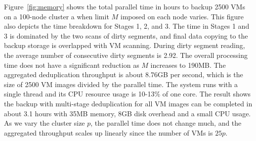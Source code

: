 %

Figure~\ref{fig:memory} shows the total parallel time in hours to backup 2500 VMs on
 a 100-node cluster a  when 
limit $M$ imposed on each node varies.
This figure also depicts the time breakdown for Stages 1, 2, and 3. 
The time in Stages 1 and 3  is  dominated by  the two scans of dirty segments,
and final data copying to the backup storage is overlapped with VM scanning.
During dirty segment reading, the average number of consecutive dirty segments is 2.92. 
The overall processing time does not have a significant reduction as $M$ increases to 190MB.
The aggregated deduplication throughput is  about 8.76GB per second,
which is the size of 2500 VM images divided by the parallel time. 
The system runs with  a single thread and  its CPU resource usage is 10-13\% of one core. 
The result shows the backup with multi-stage deduplication  for all VM images can be 
completed in about 3.1 hours with 35MB memory,  8GB disk overhead and a small CPU usage.
As we vary the cluster size $p$,  the parallel time does  not change much, and  the aggregated throughput
scales up linearly since the number of VMs is  $25p$. 

